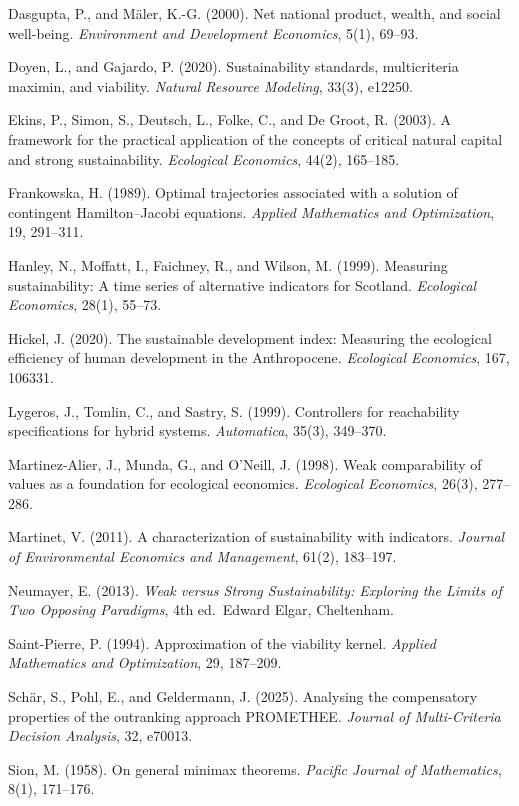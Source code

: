 \documentclass[11pt]{article}
\begin{document}
Dasgupta, P., and M\"aler, K.-G. (2000). Net national product, wealth, and
social well-being. \emph{Environment and Development Economics}, 5(1),
69--93.

Doyen, L., and Gajardo, P. (2020). Sustainability standards,
multicriteria maximin, and viability. \emph{Natural Resource Modeling},
33(3), e12250.

Ekins, P., Simon, S., Deutsch, L., Folke, C., and De Groot, R. (2003). A
framework for the practical application of the concepts of critical
natural capital and strong sustainability. \emph{Ecological Economics},
44(2), 165--185.

Frankowska, H. (1989). Optimal trajectories associated with a solution
of contingent Hamilton--Jacobi equations. \emph{Applied Mathematics and
Optimization}, 19, 291--311.

Hanley, N., Moffatt, I., Faichney, R., and Wilson, M. (1999). Measuring
sustainability: A time series of alternative indicators for Scotland.
\emph{Ecological Economics}, 28(1), 55--73.

Hickel, J. (2020). The sustainable development index: Measuring the
ecological efficiency of human development in the Anthropocene.
\emph{Ecological Economics}, 167, 106331.

Lygeros, J., Tomlin, C., and Sastry, S. (1999). Controllers for
reachability specifications for hybrid systems. \emph{Automatica},
35(3), 349--370.

Martinez-Alier, J., Munda, G., and O'Neill, J. (1998). Weak
comparability of values as a foundation for ecological economics.
\emph{Ecological Economics}, 26(3), 277--286.

Martinet, V. (2011). A characterization of sustainability with
indicators. \emph{Journal of Environmental Economics and Management},
61(2), 183--197.

Neumayer, E. (2013). \emph{Weak versus Strong Sustainability: Exploring
the Limits of Two Opposing Paradigms}, 4th ed.~Edward Elgar, Cheltenham.

Saint-Pierre, P. (1994). Approximation of the viability kernel.
\emph{Applied Mathematics and Optimization}, 29, 187--209.

Sch\"ar, S., Pohl, E., and Geldermann, J. (2025). Analysing the
compensatory properties of the outranking approach PROMETHEE.
\emph{Journal of Multi-Criteria Decision Analysis}, 32, e70013.

Sion, M. (1958). On general minimax theorems. \emph{Pacific Journal of
Mathematics}, 8(1), 171--176.
\end{document}
